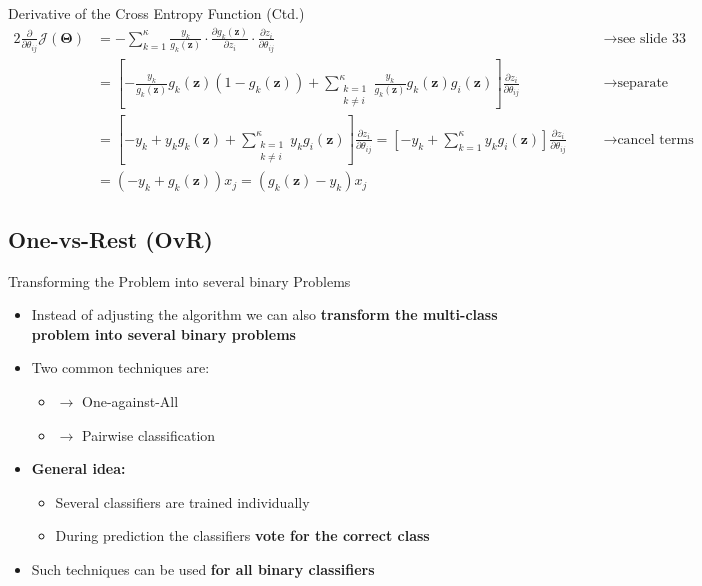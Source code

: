 \begin{frame}{Derivative of the Cross Entropy Function (Ctd.)}{}\optional
	\footnotesize
	\begin{alignat*}{2}
		\frac{\partial}{\partial \theta_{ij}} \mathcal{J}(\bm{\Theta})	
			&= 	-\sum_{k=1}^{\kappa} \frac{y_k}{g_k(\bm{z})} \cdot \frac{\partial g_k(\bm{z})}{\partial z_i} \cdot \frac{\partial z_i}{\partial \theta_{ij}}
			&&	\quad\longrightarrow \text{see slide 33}															\\[2mm]
			&= 	\left[ -\frac{y_k}{g_k(\bm{z})} g_k(\bm{z}) (1 - g_k(\bm{z})) +
				\sum_{\substack{k=1 \\ k \ne i}}^{\kappa} \frac{y_k}{g_k(\bm{z})} g_k(\bm{z}) g_i(\bm{z}) \right] 
				\frac{\partial z_i}{\partial \theta_{ij}}
			&&	\quad\longrightarrow \text{separate cases} 															\\[2mm]
			&= 	\left[ -y_k + y_k g_k(\bm{z}) + \sum_{\substack{k=1 \\ k \ne i}}^{\kappa} y_k g_i(\bm{z}) \right]
				\frac{\partial z_i}{\partial \theta_{ij}} = 
				\left[ -y_k + \sum_{k=1}^{\kappa}  y_k g_i(\bm{z}) \right] \frac{\partial z_i}{\partial \theta_{ij}} 					
			&&	\quad\longrightarrow \text{cancel terms}\\[2mm]
			&=	(-y_k + g_k(\bm{z})) x_j = \boxed{(g_k(\bm{z}) - y_k) x_j}
	\end{alignat*}
\end{frame}


\subsection{One-vs-Rest (OvR)}

\begin{frame}{Transforming the Problem into several binary Problems}{}\important
	\begin{itemize}
		\item Instead of adjusting the algorithm we can also \textbf{transform the multi-class problem into several binary problems}
		\item Two common techniques are:
		\begin{itemize}
			\item {} 	$\rightarrow$ One-against-All
			\item {} 	$\rightarrow$ Pairwise classification
		\end{itemize}
		\item \textbf{General idea:}
		\begin{itemize}
			\item Several classifiers are trained individually
			\item During prediction the classifiers \textbf{vote for the correct class}
		\end{itemize}
		\item Such techniques can be used \textbf{for all binary classifiers}
	\end{itemize}
\end{frame}


